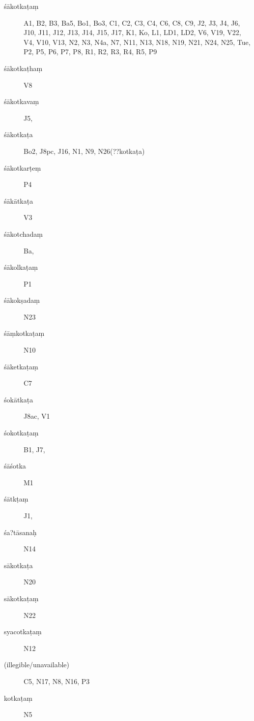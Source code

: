 \begin{ekdosis}
\begin{marma}[hp01_055]
\begin{marma}[hp01_060]
\begin{description}
      \item[śākotkaṭaṃ] A1, B2, B3, Ba5, Bo1, Bo3, C1, C2, C3, C4, C6, C8, C9, J2, J3, J4, J6, J10, J11, J12, J13, J14, J15, J17, K1, Ko, L1, LD1, LD2, V6, V19, V22, V4, V10, V13, N2, N3, N4a, N7, N11, N13, N18, N19, N21, N24, N25, Tue, P2, P5, P6, P7, P8, R1, R2, R3, R4, R5, P9
      \item[śākotkaṭhaṃ]        V8
      \item[śākotkavaṃ]        J5,
      \item[śākotkaṭa]        Bo2, J8pc, J16, N1, N9, N26(??kotkaṭa)
      \item[śākotkarṭeṃ]  P4
      \item[śākātkaṭa]        V3
      \item[śākotchadaṃ]        Ba,
      \item[śākolkaṭaṃ]   P1
      \item[śākokṣadaṃ]   N23
      \item[śāṃkotkaṭaṃ]   N10
      \item[śāketkaṭaṃ]        C7
      \item[śokātkaṭa]        J8ac, V1
      \item[śokotkaṭaṃ]        B1, J7,
      \item[śāśotka]        M1
      \item[śātkṭaṃ]        J1,
      \item[śa?tāsanaḥ]   N14
      \item[sākotkaṭa]   N20
      \item[sākotkaṭaṃ]  N22
      \item[syacotkaṭaṃ] N12
      \item[(illegible/unavailable)]        C5, N17, N8, N16, P3
      \item[kotkaṭaṃ]  N5


\end{description}
\end{marma}
\end{marma}
\end{ekdosis}
